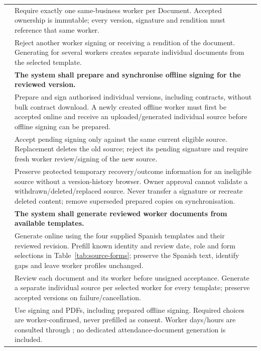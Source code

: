 {\begin{longtable}{L{0.18}L{0.82}}
\label{ac:044:a} & Require exactly one same-business worker per Document. Accepted ownership is immutable; every version, signature and rendition must reference that same worker.\\
\label{ac:044:b} & Reject another worker signing or receiving a rendition of the document. Generating for several workers creates separate individual documents from the selected template.\\
\midrule
{}
\label{fr:045}\textbf{} & \textbf{The system shall prepare and synchronise offline signing for the reviewed version.}\\*
\label{ac:045:a} & Prepare and sign authorised individual versions, including contracts, without bulk contract download. A newly created offline worker must first be accepted online and receive an uploaded/generated individual source before offline signing can be prepared.\\
\label{ac:045:b} & Accept pending signing only against the same current eligible source. Replacement deletes the old source; reject its pending signature and require fresh worker review/signing of the new source.\\
\label{ac:045:c} & Preserve protected temporary recovery/outcome information for an ineligible source without a version-history browser. Owner approval cannot validate a withdrawn/deleted/replaced source. Never transfer a signature or recreate deleted content; remove superseded prepared copies on synchronisation.\\
\midrule
{}
\label{fr:063}\textbf{} & \textbf{The system shall generate reviewed worker documents from available templates.}\\*
\label{ac:063:a} & Generate online using the four supplied Spanish templates and their reviewed revision. Prefill known identity and review date, role and form selections in Table~\ref{tab:source-forms}; preserve the Spanish text, identify gaps and leave worker profiles unchanged.\\
\label{ac:063:b} & Review each document and its worker before unsigned acceptance. Generate a separate individual source per selected worker for every template; preserve accepted versions on failure/cancellation.\\
\label{ac:063:c} & Use  signing and  PDFs, including prepared offline signing. Required choices are worker-confirmed, never prefilled as consent. Worker days/hours are consulted through ; no dedicated attendance-document generation is included.\\
\end{longtable}
}
